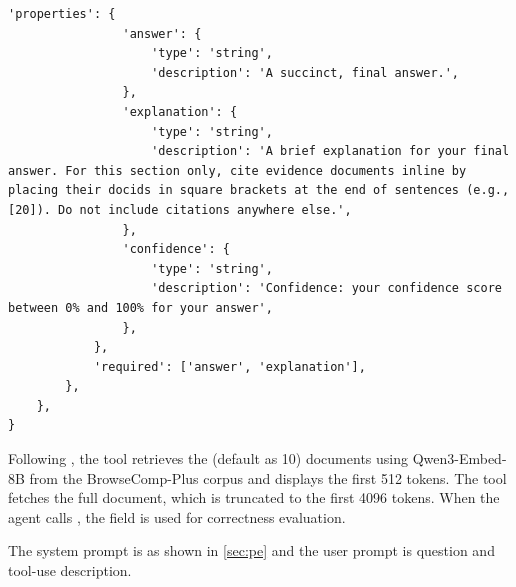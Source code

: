 {\begin{Verbatim}[breaklines, breakanywhere]
            'properties': {
                'answer': {
                    'type': 'string',
                    'description': 'A succinct, final answer.',
                },
                'explanation': {
                    'type': 'string',
                    'description': 'A brief explanation for your final answer. For this section only, cite evidence documents inline by placing their docids in square brackets at the end of sentences (e.g., [20]). Do not include citations anywhere else.',
                },
                'confidence': {
                    'type': 'string',
                    'description': 'Confidence: your confidence score between 0% and 100% for your answer',
                },
            },
            'required': ['answer', 'explanation'],
        },
    },
}
\end{Verbatim}
}

Following \citet{Chen2025BrowseCompPlusAM}, the  tool retrieves the  (default as 10) documents using Qwen3-Embed-8B from the BrowseComp-Plus corpus and displays the first 512 tokens. 
The  tool fetches the full document, which is truncated to the first 4096 tokens. 
When the agent calls , the  field is used for correctness evaluation.

The system prompt is as shown in \ref{sec:pe} and the user prompt is question and tool-use description. 


